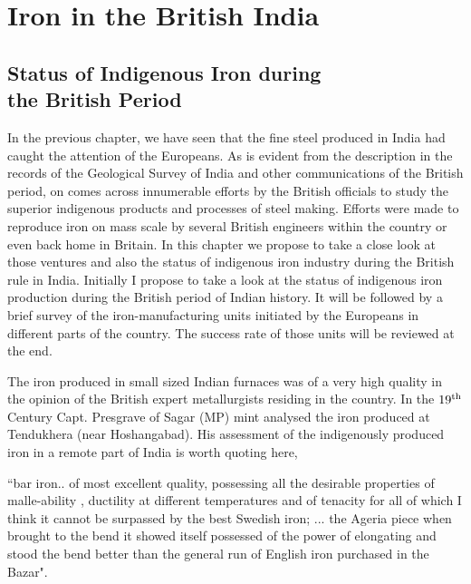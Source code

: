 \chapter{Iron in the British India}\label{chapter6}



\vspace{-.5cm}

\section*{Status of Indigenous Iron during\\ the British Period}\label{chapter6-section-1}

\vspace{-.2cm}

In the previous chapter, we have seen that the fine steel produced in India had caught the attention of the Europeans. As is evident from the description in the records of the Geological Survey of India and other communications of the British period, on comes across innumerable efforts by the British officials to study the superior indigenous products and processes of steel making. Efforts were made to reproduce iron on mass scale by several British engineers within the country or even back home in Britain. In this chapter we propose to take a close look at those ventures and also the status of indigenous iron industry during the British rule in India. Initially I propose to take a look at the status of indigenous iron production during the British period of Indian history. It will be followed by a brief survey of the iron-manufacturing units initiated by the Europeans in different parts of the country. The success rate of those units will be reviewed at the end.

The iron produced in small sized Indian furnaces was of a very high quality in the opinion of the British expert metallurgists residing in the country.  In the $19^{\rm th}$ Century Capt. Presgrave of Sagar (MP) mint analysed the iron produced at Tendukhera (near Hoshangabad).  His assessment of the indigenously produced iron in a remote part of India is worth quoting here,

{\footnotesize{``bar iron.. of most excellent quality, possessing all the desirable properties of malle-\break ability , ductility at different temperatures and of tenacity for all of which I think it cannot be surpassed by the best Swedish iron; ... the Ageria piece when brought to the bend it showed itself possessed of the power of elongating and stood the bend better than the general run of English iron purchased in the Bazar".}}


